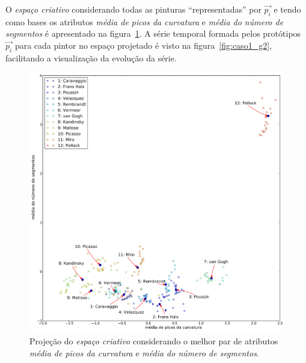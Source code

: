 O \textit{espaço criativo} considerando todas as pinturas
``representadas'' por $\vec{p_i}$ e tendo como bases os
atributos \emph{média de picos da curvatura} e \emph{média do número
de segmentos} é apresentado na figura~\ref{fig:caso1_g1}. A série
temporal formada pelos protótipos $\vec{p_i}$ para cada pintor no
espaço projetado é visto na figura~\ref{fig:caso1_g2}, facilitando a
visualização da evolução da série.

\begin{figure}[h!]
\begin{center}
           \caption{Projeção do \textit{espaço criativo} considerando o
        melhor par de atributos \emph{média de picos da curvatura} e
        \emph{média do número de segmentos}.}
        \label{fig:caso1_g1}
        \includegraphics[scale=.5]{figs/caso1_g1}
        \fonteminha
\end{center}
\end{figure}

